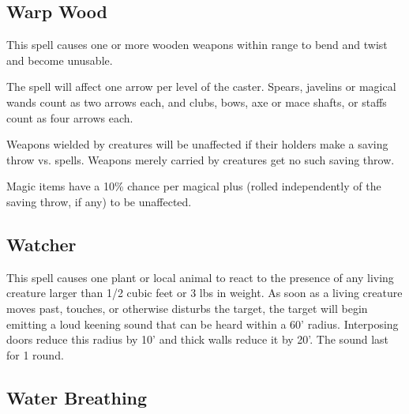 \begin{multicols*}{2}
\subsection{Warp Wood}\label{spell:Warp Wood}

This spell causes one or more wooden weapons within range to bend and twist and become unusable.

The spell will affect one arrow per level of the caster. Spears, javelins or magical wands count as two arrows each, and clubs, bows, axe or mace shafts, or staffs count as four arrows each.

Weapons wielded by creatures will be unaffected if their holders make a saving throw vs. spells. Weapons merely carried by creatures get no such saving throw.

Magic items have a 10\% chance per magical plus (rolled independently of the saving throw, if any) to be unaffected.

\subsection{Watcher}\label{spell:Watcher}

This spell causes one plant or local animal to react to the presence of any living creature larger than 1/2 cubic feet or 3 lbs in weight. As soon as a living creature moves past, touches, or otherwise disturbs the target, the target will begin emitting a loud keening sound that can be heard within a 60' radius. Interposing doors reduce this radius by 10' and thick walls reduce it by 20'. The sound last for 1 round.

\subsection{Water Breathing}\label{spell:Water Breathing}
\end{multicols*}
